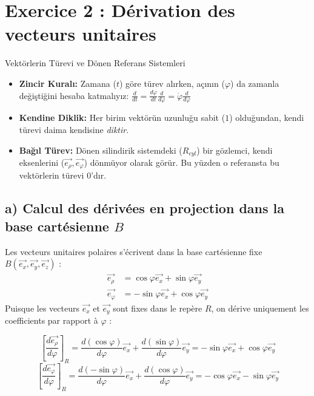 \documentclass[11pt,a4paper]{article}
\begin{document}
\newpage

\section*{Exercice 2 : Dérivation des vecteurs unitaires}

\begin{theoriebox}{Vektörlerin Türevi ve Dönen Referans Sistemleri}
\begin{itemize}
    \item \textbf{Zincir Kuralı:} Zamana ($t$) göre türev alırken, açının ($\varphi$) da zamanla değiştiğini hesaba katmalıyız: $\frac{d}{dt} = \frac{d\varphi}{dt} \frac{d}{d\varphi} = \dot{\varphi} \frac{d}{d\varphi}$
    \item \textbf{Kendine Diklik:} Her birim vektörün uzunluğu sabit ($1$) olduğundan, kendi türevi daima kendisine \textit{diktir}. 
    \item \textbf{Bağıl Türev:} Dönen silindirik sistemdeki ($R_{cyl}$) bir gözlemci, kendi eksenlerini ($\vec{e_\rho}, \vec{e_\varphi}$) dönmüyor olarak görür. Bu yüzden o referansta bu vektörlerin türevi $0$'dır.
\end{itemize}
\end{theoriebox}

\subsection*{a) Calcul des dérivées en projection dans la base cartésienne $B$}
Les vecteurs unitaires polaires s'écrivent dans la base cartésienne fixe $B (\vec{e_x}, \vec{e_y}, \vec{e_z})$ :
\begin{align*}
\vec{e_\rho} &= \cos\varphi \vec{e_x} + \sin\varphi \vec{e_y} \\
\vec{e_\varphi} &= -\sin\varphi \vec{e_x} + \cos\varphi \vec{e_y}
\end{align*}
Puisque les vecteurs $\vec{e_x}$ et $\vec{e_y}$ sont fixes dans le repère $R$, on dérive uniquement les coefficients par rapport à $\varphi$ :
\begin{sonucbox}
$$ \left[\frac{d\vec{e_\rho}}{d\varphi}\right]_R = \frac{d(\cos\varphi)}{d\varphi} \vec{e_x} + \frac{d(\sin\varphi)}{d\varphi} \vec{e_y} = -\sin\varphi \vec{e_x} + \cos\varphi \vec{e_y} $$
$$ \left[\frac{d\vec{e_\varphi}}{d\varphi}\right]_R = \frac{d(-\sin\varphi)}{d\varphi} \vec{e_x} + \frac{d(\cos\varphi)}{d\varphi} \vec{e_y} = -\cos\varphi \vec{e_x} - \sin\varphi \vec{e_y} $$
\end{sonucbox}
\end{document}
